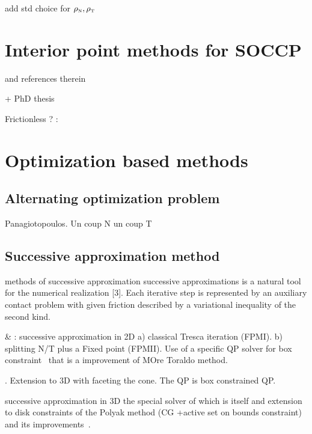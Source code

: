 \begin{ndrva}
  add std choice for $\rho_{\hbox{\tiny{N}}},\rho_{\hbox{\tiny{T}}}$
\end{ndrva}
\clearpage
\section{Interior point methods for SOCCP}
\label{Sec:InteriorPoint}

\cite{Kleinert.ea_CMAME2014} and references therein

\cite{Christensen.Pang1998}


\cite{Heyn.ea_IJNME2013} + PhD thesis \cite{Heyn_PhD2013}

Frictionless ? :\cite{Miyamura.ea_IJNME2010,Temizer.ea_CMAME2014}
 

\section{Optimization based methods}
\label{Sec:OptimisationBasedMethods}

\subsection{Alternating optimization problem}
Panagiotopoulos. Un coup N un coup T

\subsection{Successive approximation  method}

methods of successive approximation successive approximations is a natural tool for the numerical realization [3]. Each iterative step is represented by an auxiliary contact problem with given friction described by a variational inequality of the second kind.


\cite{Haslinger.ea_CMAME2002} \& \cite{Dostal_JCAM2002} : successive approximation in 2D a) classical Tresca iteration (FPMI).  b) splitting N/T plus a Fixed point (FPMII). Use of a specific QP solver for box constraint~\cite{Dostal_SIOPT1997} that is a improvement of MOre Toraldo method.

\cite{Haslinger.ea_JCAM2004}.  Extension to 3D with faceting the cone. The QP is box constrained QP.


\cite{Haslinger.ea_MCS2012}  successive approximation in 3D the special solver of \cite{Kucera_OMS2007,Kucera_SIOPT2008} which is itself and extension to disk constraints of the Polyak method (CG +active set on bounds constraint) and its improvements~\cite{Dostal_SIOPT1997,Dostal.Schoberl_COA2005}.



